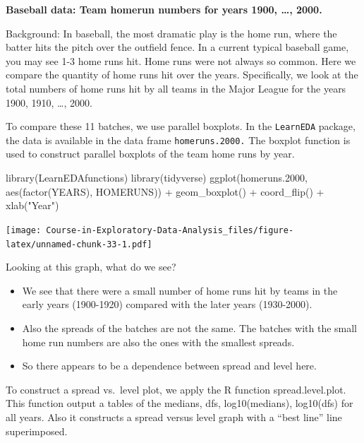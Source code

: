 \documentclass[
]{book}
\newenvironment{Shaded}{\begin{snugshade}}{\end{snugshade}}
\newcommand{\FloatTok}[1]{\textcolor[rgb]{0.00,0.00,0.81}{#1}}
\newcommand{\FunctionTok}[1]{\textcolor[rgb]{0.00,0.00,0.00}{#1}}
\newcommand{\NormalTok}[1]{#1}
\newcommand{\SpecialCharTok}[1]{\textcolor[rgb]{0.00,0.00,0.00}{#1}}
\newcommand{\StringTok}[1]{\textcolor[rgb]{0.31,0.60,0.02}{#1}}
\providecommand{\tightlist}{%
  \setlength{\itemsep}{0pt}\setlength{\parskip}{0pt}}
\begin{document}
\textbf{Baseball data: Team homerun numbers for years 1900, \ldots, 2000.}

Background: In baseball, the most dramatic play is the home run, where the batter hits the pitch over the outfield fence. In a current typical baseball game, you may see 1-3 home runs hit. Home runs were not always so common. Here we compare the quantity of home runs hit over the years. Specifically, we look at the total numbers of home runs hit by all teams in the Major League for the years 1900, 1910, \ldots, 2000.

To compare these 11 batches, we use parallel boxplots. In the \texttt{LearnEDA} package, the data is available in the data frame \texttt{homeruns.2000.}
The boxplot function is used to construct parallel boxplots of the team home runs by year.

\begin{Shaded}
\begin{Highlighting}[]
\FunctionTok{library}\NormalTok{(LearnEDAfunctions)}
\FunctionTok{library}\NormalTok{(tidyverse)}
\FunctionTok{ggplot}\NormalTok{(homeruns}\FloatTok{.2000}\NormalTok{, }\FunctionTok{aes}\NormalTok{(}\FunctionTok{factor}\NormalTok{(YEARS), HOMERUNS)) }\SpecialCharTok{+}
  \FunctionTok{geom\_boxplot}\NormalTok{() }\SpecialCharTok{+} \FunctionTok{coord\_flip}\NormalTok{() }\SpecialCharTok{+}
  \FunctionTok{xlab}\NormalTok{(}\StringTok{"Year"}\NormalTok{)}
\end{Highlighting}
\end{Shaded}

\texttt{[image: Course-in-Exploratory-Data-Analysis\_files/figure-latex/unnamed-chunk-33-1.pdf]}

Looking at this graph, what do we see?

\begin{itemize}
\tightlist
\item
  We see that there were a small number of home runs hit by teams in the early years (1900-1920) compared with the later years (1930-2000).
\item
  Also the spreads of the batches are not the same. The batches with the small home run numbers are also the ones with the smallest spreads.
\item
  So there appears to be a dependence between spread and level here.
\end{itemize}

To construct a spread vs.~level plot, we apply the R function spread.level.plot. This function output a tables of the medians, dfs, log10(medians), log10(dfs) for all years. Also it constructs a spread versus level graph with a ``best line'' line superimposed.
\end{document}
